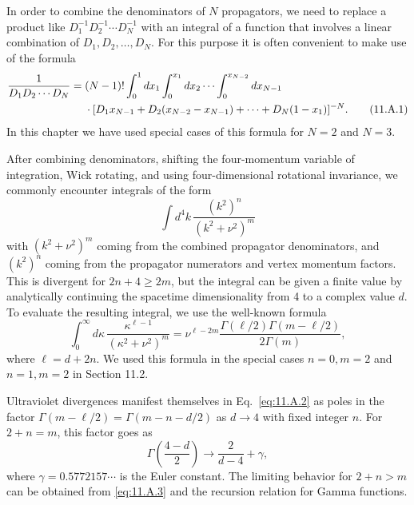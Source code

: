 

In order to combine the denominators of $N$ propagators, we need to replace a
product like $D_1^{-1}D_2^{-1}\cdots D_N^{-1}$ with an integral of a function
that involves a linear combination of $D_1,D_2,\ldots,D_N$. For this purpose
it is often convenient to make use of the formula
\begin{align}
\frac{1}{D_1D_2\cdots D_N}
={}&(N-1)!\int_0^1dx_1\int_0^{x_1}dx_2\cdots
\int_0^{x_{N-2}}dx_{N-1}\notag\\
&\cdot[D_1x_{N-1}+D_2(x_{N-2}-x_{N-1})+\cdots+D_N(1-x_1)]^{-N}.
\tag{11.A.1}\label{eq:11.A.1}
\end{align}
In this chapter we have used special cases of this formula for $N=2$ and
$N=3$.

After combining denominators, shifting the four-momentum variable of
integration, Wick rotating, and using four-dimensional rotational invariance,
we commonly encounter integrals of the form
\[
\int d^4k\,\frac{(k^2)^n}{(k^2+\nu^2)^m}
\]
with $(k^2+\nu^2)^m$ coming from the combined propagator denominators, and
$(k^2)^n$ coming from the propagator numerators and vertex momentum factors.
This is divergent for $2n+4\geq2m$, but the integral can be given a finite
value by analytically continuing the spacetime dimensionality from 4 to a
complex value $d$. To evaluate the resulting integral, we use the well-known
formula
\begin{equation}
\int_0^\infty d\kappa\,\frac{\kappa^{\ell-1}}{(\kappa^2+\nu^2)^m}
=\nu^{\ell-2m}\frac{\Gamma(\ell/2)\Gamma(m-\ell/2)}{2\Gamma(m)},
\tag{11.A.2}\label{eq:11.A.2}
\end{equation}
where $\ell=d+2n$. We used this formula in the special cases $n=0,m=2$ and
$n=1,m=2$ in Section 11.2.

Ultraviolet divergences manifest themselves in Eq.~\eqref{eq:11.A.2} as poles in the
factor $\Gamma(m-\ell/2)=\Gamma(m-n-d/2)$ as $d\to4$ with fixed integer $n$.
For $2+n=m$, this factor goes as
\begin{equation}
\Gamma\left(\frac{4-d}{2}\right)\to\frac{2}{d-4}+\gamma,
\tag{11.A.3}\label{eq:11.A.3}
\end{equation}
where $\gamma=0.5772157\cdots$ is the Euler constant. The limiting behavior for
$2+n>m$ can be obtained from \eqref{eq:11.A.3} and the recursion relation for Gamma
functions.
